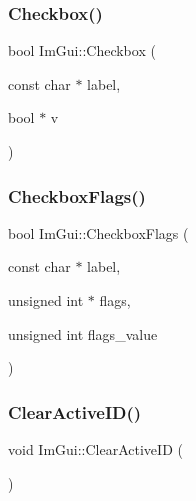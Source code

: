 \hypertarget{namespace_im_gui_a57d73c1d0ef807fef734d91024092027}{}\label{namespace_im_gui_a57d73c1d0ef807fef734d91024092027} 
\subsubsection{\texorpdfstring{Checkbox()}{Checkbox()}}
{\footnotesize\ttfamily bool Im\+Gui\+::\+Checkbox (\begin{DoxyParamCaption}\item[{const char $\ast$}]{label,  }\item[{bool $\ast$}]{v }\end{DoxyParamCaption})}

\hypertarget{namespace_im_gui_aeca400dcf5a82c312b3e669d2fe6e88d}{}\label{namespace_im_gui_aeca400dcf5a82c312b3e669d2fe6e88d} 
\subsubsection{\texorpdfstring{Checkbox\+Flags()}{CheckboxFlags()}}
{\footnotesize\ttfamily bool Im\+Gui\+::\+Checkbox\+Flags (\begin{DoxyParamCaption}\item[{const char $\ast$}]{label,  }\item[{unsigned int $\ast$}]{flags,  }\item[{unsigned int}]{flags\+\_\+value }\end{DoxyParamCaption})}

\hypertarget{namespace_im_gui_a17ff60ad1e2669130ac38a04d16eb354}{}\label{namespace_im_gui_a17ff60ad1e2669130ac38a04d16eb354} 
\subsubsection{\texorpdfstring{Clear\+Active\+I\+D()}{ClearActiveID()}}
{\footnotesize\ttfamily void Im\+Gui\+::\+Clear\+Active\+ID (\begin{DoxyParamCaption}{ }\end{DoxyParamCaption})}

\hypertarget{namespace_im_gui_a5e8e4df6418dcda3c4c5d15ecdf7d968}{}\label{namespace_im_gui_a5e8e4df6418dcda3c4c5d15ecdf7d968} 
